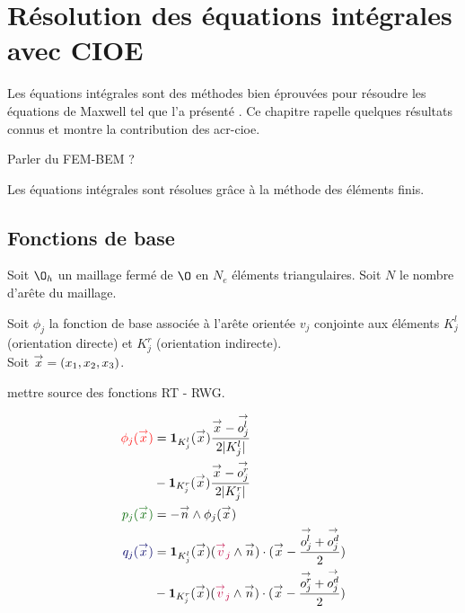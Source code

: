 \section{Résolution des équations intégrales avec CIOE}
  Les équations intégrales sont des méthodes bien éprouvées pour résoudre les équations de Maxwell tel que l'a présenté \cite{nedelec_acoustic_2001}. Ce chapitre  rapelle quelques résultats connus et montre la contribution des \gls{acr-cioe}.

  \begin{TODO} 
    Parler du FEM-BEM ?
  \end{TODO}

  Les équations intégrales sont résolues grâce à la méthode des éléments finis.

  \subsection{Fonctions de base}
    Soit \(\O_h\) un maillage fermé de \(\O\) en \(N_e\) éléments triangulaires. Soit \(N\) le nombre d'arête du maillage.

    Soit \(\phi_j\) la fonction de base associée à l’arête orientée \(v_j\) conjointe aux éléments  \(K_j^l\) (orientation directe) et \(K_j^r\) (orientation indirecte).\\

    Soit \(\vx = (x_1,x_2,x_3)\).

    \begin{TODO}
      mettre source des fonctions RT - RWG.
    \end{TODO}


    \begin{minipage}{0.58\textwidth}
      \centering
      \begin{tikzpicture}[scale=2.5]
        
      \end{tikzpicture}
    \end{minipage} 
    \begin{minipage}{0.4\textwidth}
      \begin{align*}
        \color{red}{\phi_j(\vx)} &= \mathbf{1}_{K_j^l}(\vx)\frac{\vx-\vect{o_j^l}}{2|K_j^l|} \\&- \mathbf{1}_{K_j^r}(\vx)\frac{\vx-\vect{o_j^r}}{2|K_j^r|}\\
        \color{black!60!green}{p_j(\vx)} &= -\vn \pvect \phi_j(\vx)\\
        \color{black!60!blue}{q_j(\vx)} &= \mathbf{1}_{K_j^l}(\vx) ( { \color{purple}{\vect{v}_j } } \pvect \vn ) \cdot ( \vx - \frac{\vect{o^l_j} + \vect{o^d_j}}{2} ) \\
        &- \mathbf{1}_{K_j^r}(\vx) ( { \color{purple}{\vect{v}_j } } \pvect \vn ) \cdot ( \vx - \frac{\vect{o^r_j} + \vect{o^d_j}}{2} )
      \end{align*}
    \end{minipage}

